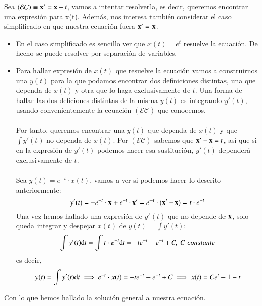 \begin{eg}\label{eg:lineal-order}
    Sea $\mathcal{(EC)} \equiv \mathbf{x'} = \mathbf{x} + t$, vamos a intentar resolverla, es decir, queremos encontrar una expresión para x(t). Además, nos interesa también considerar el caso simplificado en que nuestra ecuación fuera $\mathbf{x'} = \mathbf{x}$.
    \begin{itemize}
        \item En el caso simplificado es sencillo ver que $x(t) = e^t$ resuelve la ecuación. De hecho se puede resolver por separación de variables.

        \item Para hallar expresión de $x(t)$ que resuelve la ecuación vamos a construirnos una $y(t)$ para la que podamos encontrar dos definiciones distintas, una que dependa de $x(t)$ y otra que lo haga exclusivamente de $t$. Una forma de hallar las dos deficiones distintas de la misma $y(t)$ es integrando $y'(t)$, usando convenientemente la ecuación $\mathcal{(EC)}$ que conocemos.\\\\
        Por tanto, queremos encontrar una $y(t)$ que dependa de $x(t)$ y que $\int y'(t)$ no dependa de $x(t)$. Por $\mathcal{(EC)}$ sabemos que $\mathbf{x'} - \mathbf{x} = t$, así que si en la expresión de $y'(t)$ podemos hacer esa sustitución, $y'(t)$ dependerá exclusivamente de $t$.\\\\
        Sea $y(t) = e^{-t}\cdot x(t)$, vamos a ver si podemos hacer lo descrito anteriormente:
        $$
            y'(t) = -e^{-t}\cdot \mathbf{x} + e^{-t} \cdot \mathbf{x'} = e^{-t} \cdot (\mathbf{x'}  - \mathbf{x}) = t \cdot e^{-t}
        $$
        Una vez hemos hallado una expresión de $y'(t)$ que no depende de $\mathbf{x}$, solo queda integrar y despejar $x(t)$ de $y(t) = \int y'(t)$:
        $$
            \int y'(t) \mathrm{d} t = \int t \cdot e^{-t} \mathrm{d} t = -te^{-t} - e^{-t} + C,\ C\ constante
        $$
        es decir,
        $$
            y(t) = \int y'(t) \mathrm{d} t \implies e^{-t} \cdot x(t) = -te^{-t} - e^{-t} + C \implies x(t) = Ce^t - 1 - t
        $$
    \end{itemize}
    Con lo que hemos hallado la solución general a nuestra ecuación.
\end{eg}
